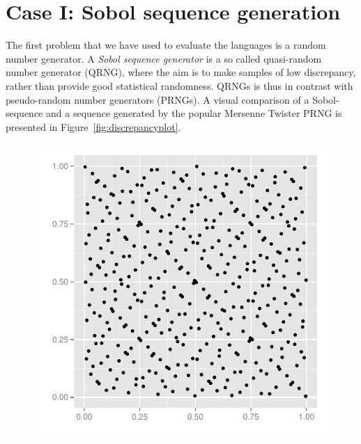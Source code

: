 \documentclass{llncs2e/llncs}
\begin{document}
\section{Case I: Sobol sequence generation}
The first problem that we have used to evaluate the languages is a
random number generator. A \emph{Sobol sequence generator} is a so
called quasi-random number generator (QRNG), where the aim is to make
samples of low discrepancy, rather than provide good statistical
randomness. QRNGs is thus in contrast with pseudo-random number
generators (PRNGs). A visual comparison of a Sobol-sequence and a
sequence generated by the popular Mersenne Twister PRNG is presented
in Figure~\ref{fig:discrepancyplot}.
\begin{figure}
  \centering
  \begin{minipage}{0.45\linewidth}
    \begin{center}
      \includegraphics[width=\textwidth]{../report/graphics/2D-sobol-sequence.pdf}


\end{center}
\end{minipage}
\end{figure}
\end{document}
